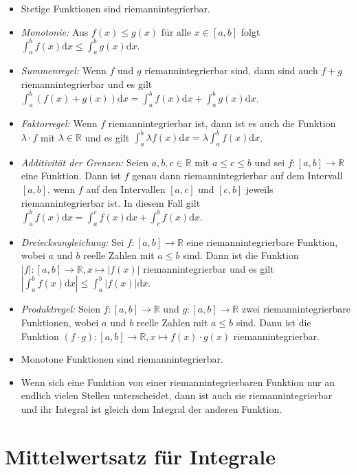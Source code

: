\documentclass[fontsize=9pt,
               parskip=half-,
               DIV=14,
               listof=chapterentry,
               tocflat]{scrbook}
\begin{document}
\begin{itemize}
\item Stetige Funktionen sind riemannintegrierbar.
\item \emph{Monotonie:} Aus $f(x)\leq g(x)$ für alle $x\in [a,b]$ folgt $\int _{a}^{b}f(x)\mathrm {d} x\leq \int _{a}^{b}g(x)\mathrm {d} x$.
\item \emph{Summenregel:} Wenn $f$ und $g$ riemannintegrierbar sind, dann sind auch $f+g$ riemannintegrierbar und es gilt $\int _{a}^{b}\left(f(x)+g(x)\right)\mathrm {d} x=\int _{a}^{b}f(x)\mathrm {d} x+\int _{a}^{b}g(x)\mathrm {d} x$.
\item \emph{Faktorregel:} Wenn $f$ riemannintegrierbar ist, dann ist es auch die Funktion $\lambda \cdot f$ mit $\lambda \in \mathbb {R} $ und es gilt $\int _{a}^{b}\lambda f(x)\mathrm {d} x=\lambda \int _{a}^{b}f(x)\mathrm {d} x$.
\item \emph{Additivität der Grenzen:} Seien $a,b,c\in \mathbb {R} $ mit $a\leq c\leq b$ und sei $f:[a,b]\to \mathbb {R} $ eine Funktion. Dann ist $f$ genau dann riemannintegrierbar auf dem Intervall $[a,b]$, wenn $f$ auf den Intervallen $[a,c]$ und $[c,b]$ jeweils riemannintegrierbar ist. In diesem Fall gilt $\int _{a}^{b}f(x)\mathrm {d} x=\int _{a}^{c}f(x)\mathrm {d} x+\int _{c}^{b}f(x)\mathrm {d} x$.
\item \emph{Dreiecksungleichung:} Sei $f:[a,b]\to \mathbb {R} $ eine riemannintegrierbare Funktion, wobei $a$ und $b$ reelle Zahlen mit $a\leq b$ sind. Dann ist die Funktion $|f|:[a,b]\to \mathbb {R} ,x\mapsto |f(x)|$ riemannintegrierbar und es gilt $\left|\int _{a}^{b}f(x)\mathrm {d} x\right|\leq \int _{a}^{b}|f(x)|\mathrm {d} x$.
\item \emph{Produktregel:} Seien $f:[a,b]\to \mathbb {R} $ und $g:[a,b]\to \mathbb {R} $ zwei riemannintegrierbare Funktionen, wobei $a$ und $b$ reelle Zahlen mit $a\leq b$ sind. Dann ist die Funktion $(f\cdot g):[a,b]\to \mathbb {R} ,x\mapsto f(x)\cdot g(x)$ riemannintegrierbar.
\item Monotone Funktionen sind riemannintegrierbar.
\item Wenn sich eine Funktion von einer riemannintegrierbaren Funktion nur an endlich vielen Stellen unterscheidet, dann ist auch sie riemannintegrierbar und ihr Integral ist gleich dem Integral der anderen Funktion.
\end{itemize}

\chapter{Mittelwertsatz für Integrale}
\end{document}
